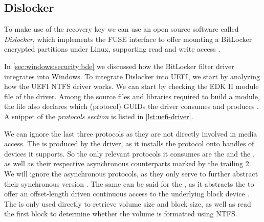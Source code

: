 \subsection{Dislocker}

To make use of the recovery key we can use an open source software called \emph{Dislocker}, which implements the \ac{FUSE} interface to offer mounting a BitLocker encrypted partitions under Linux, supporting read and write access \cite{dislocker}.

In \autoref{sec:windows:security:bde} we discussed how the BitLocker filter driver integrates into Windows.
To integrate Dislocker into \ac{UEFI}, we start by analyzing how the \ac{UEFI} \ac{NTFS} driver works.
We can start by checking the \ac{EDK} II module file of the driver.
Among the source files and libraries required to build a module, the file also declares which (protocol) \acp{GUID} the driver consumes and produces \cite{tianocore-edk2-module-writer-s-guide}.
A snippet of the \emph{protocols section} is listed in \autoref{lst:uefi-driver}.

\vspace{1em}



We can ignore the last three protocols as they are not directly involved in media access.
The  is produced by the driver, as it installs the protocol onto handles of devices it supports.
So the only relevant protocols it consumes are the  and the , as well as their respective asynchronous counterparts marked by the trailing 2.
We will ignore the asynchronous protocols, as they only serve to further abstract their synchronous version \cite[Sections 13.8 and 13.10]{uefi-spec}.
The same can be said for the , as it abstracts the  to offer an offset-length driven continuous access to the underlying block device \cite[Section 13.7]{uefi-spec}.
The  is only used directly to retrieve volume size and block size, as well as read the first block to determine whether the volume is formatted using \ac{NTFS}.

